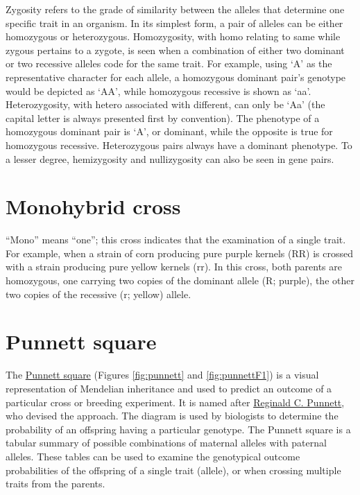 Zygosity refers to the grade of similarity between the alleles that determine one specific trait in an organism. In its simplest form, a pair of alleles can be either homozygous or heterozygous. Homozygosity, with homo relating to same while zygous pertains to a zygote, is seen when a combination of either two dominant or two recessive alleles code for the same trait. For example, using `A' as the representative character for each allele, a homozygous dominant pair's genotype would be depicted as `AA', while homozygous recessive is shown as `aa'. Heterozygosity, with hetero associated with different, can only be `Aa' (the capital letter is always presented first by convention). The phenotype of a homozygous dominant pair is `A', or dominant, while the opposite is true for homozygous recessive. Heterozygous pairs always have a dominant phenotype. To a lesser degree, hemizygosity and nullizygosity can also be seen in gene pairs.

\hypertarget{monohybrid-cross}{%
\section{Monohybrid cross}\label{monohybrid-cross}}

``Mono'' means ``one''; this cross indicates that the examination of a single trait. For example, when a strain of corn producing pure purple kernels (RR) is crossed with a strain producing pure yellow kernels (rr). In this cross, both parents are homozygous, one carrying two copies of the dominant allele (R; purple), the other two copies of the recessive (r; yellow) allele.

\hypertarget{punnett-square}{%
\section{Punnett square}\label{punnett-square}}

The \href{https://en.wikipedia.org/wiki/Punnett_square}{Punnett square} (Figures \ref{fig:punnett} and \ref{fig:punnettF1}) is a visual representation of Mendelian inheritance and used to predict an outcome of a particular cross or breeding experiment. It is named after \href{https://en.wikipedia.org/wiki/Reginald_Punnett}{Reginald C. Punnett}, who devised the approach. The diagram is used by biologists to determine the probability of an offspring having a particular genotype. The Punnett square is a tabular summary of possible combinations of maternal alleles with paternal alleles. These tables can be used to examine the genotypical outcome probabilities of the offspring of a single trait (allele), or when crossing multiple traits from the parents.

